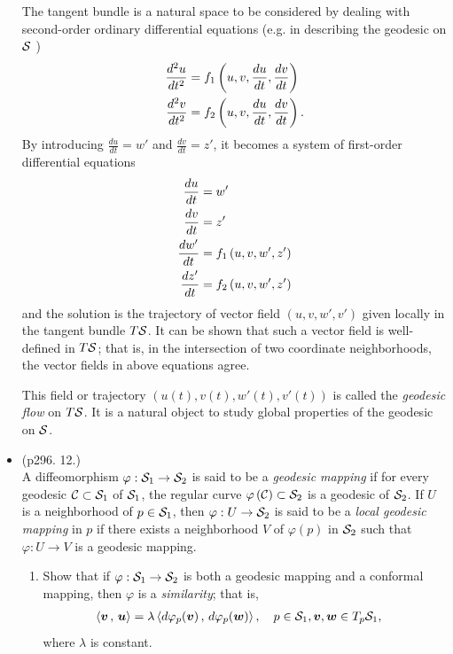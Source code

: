 \documentclass[11pt]{article}
\begin{document}
\begin{itemize}
\begin{example}
The tangent bundle is a natural space to be considered by dealing with second-order ordinary differential equations (e.g. in describing the geodesic on ${\mathcal S}$ ) 
\begin{align*}
\frac{d^{2}u}{dt^{2}} &= f_{1}\left(u, v, \frac{du}{dt}, \frac{dv}{dt}\right)\\
\frac{d^{2}v}{dt^{2}} &= f_{2}\left(u, v, \frac{du}{dt}, \frac{dv}{dt}\right).
\end{align*}
By introducing $\frac{du}{dt} = w'$ and $\frac{dv}{dt} = z'$,  it becomes a system of first-order differential equations
\begin{align*}
\frac{du}{dt} &= w'\\
\frac{dv}{dt} &= z'\\
\frac{dw'}{dt} &= f_{1}\left(u, v, w', z'\right)\\
\frac{dz'}{dt} &= f_{2}\left(u, v, w', z'\right)
\end{align*}
and the solution is the trajectory of vector field $(u, v, w', v')$ given locally in the tangent bundle $T{\mathcal S}$. It can be shown that such a vector field is well-defined in $T{\mathcal S}$; that is, in the intersection of two coordinate neighborhoods, the vector fields in above equations agree. 

\begin{definition} This field or trajectory $(u(t), v(t), w'(t), v'(t))$ is called the \emph{geodesic flow} on $T{\mathcal S}$. It is a natural object to study global properties of the geodesic on ${\mathcal S}$.
\end{definition}
\end{example}


\newpage
\item  \begin{example} \citep{do1976differential} (p296. 12.)\\
A diffeomorphism $\varphi: {\mathcal S}_{1} \rightarrow {\mathcal S}_{2}$ is said to be a \emph{geodesic mapping} if for every geodesic ${\mathcal C}\subset {\mathcal S}_{1}$ of ${\mathcal S}_{1}$, the regular curve $\varphi\left({\mathcal C}\right) \subset {\mathcal S}_{2}$ is a geodesic of ${\mathcal S}_{2}$. If $U$ is a neighborhood of $p\in {\mathcal S}_{1}$, then $\varphi: U \rightarrow {\mathcal S}_{2}$ is said to be a \emph{local geodesic mapping} in $p$ if there exists a neighborhood $V$ of $\varphi(p)$ in ${\mathcal S}_{2}$ such that $\varphi: U\rightarrow V$ is a geodesic mapping. 
\begin{enumerate}
\item Show that if $\varphi: {\mathcal S}_{1} \rightarrow {\mathcal S}_{2}$ is both a geodesic mapping and a conformal mapping, then $\varphi$ is a \emph{similarity};  that is,
\begin{align*}
\left\langle \boldsymbol{v}\,,\, \boldsymbol{u} \right\rangle &= \lambda\left\langle d\varphi_{p}(\boldsymbol{v})\,,\, d\varphi_{p}(\boldsymbol{w}) \right\rangle, \quad p\in {\mathcal S}_{1}, \boldsymbol{v},\boldsymbol{w} \in T_{p}{\mathcal S}_{1},
\end{align*}
where $\lambda$ is constant.  


\end{enumerate}
\end{example}
\end{itemize}
\end{document}
